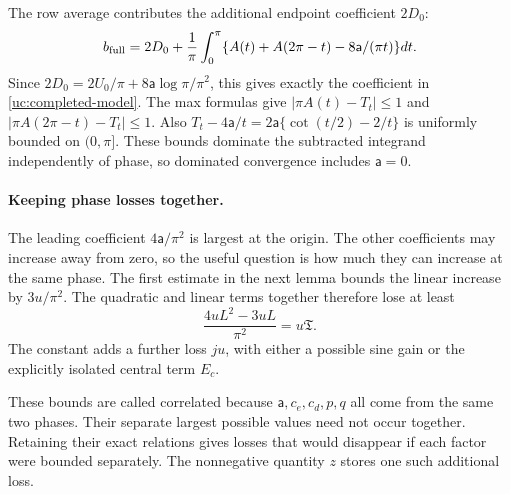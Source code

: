 The row average contributes the additional endpoint coefficient $2D_0$:
\[
 b_{\rm full}=2D_0+\frac1\pi\int_0^\pi
       \{A(t)+A(2\pi-t)-8\mathsf a/(\pi t)\}dt.
\]
Since $2D_0=2U_0/\pi+8\mathsf a\log\pi/\pi^2$, this gives exactly
the coefficient in \eqref{uc:completed-model}.
The max formulas give
$|\pi A(t)-T_t|\leq1$ and $|\pi A(2\pi-t)-T_t|\leq1$.
Also $T_t-4\mathsf a/t=2\mathsf a\{\cot(t/2)-2/t\}$ is uniformly
bounded on $(0,\pi]$. These bounds dominate the subtracted integrand
independently of phase, so dominated convergence includes $\mathsf{a}=0$.

\paragraph{Keeping phase losses together.}
The leading coefficient $4\mathsf{a}/\pi^2$ is largest at the origin. The
other coefficients may increase away from zero, so the useful question
is how much they can increase at the same phase. The first estimate
in the next lemma bounds the linear increase by $3u/\pi^2$. The
quadratic and linear terms together therefore lose at least
\[
 \frac{4uL^2-3uL}{\pi^2}=u\mathfrak{T}.
\]
The constant adds a further loss $ju$, with either a possible sine gain
or the explicitly isolated central term $E_c$.

These bounds are called correlated because $\mathsf{a},c_e,c_d,p,q$ all come
from the same two phases. Their separate largest possible values need
not occur together. Retaining their exact relations gives losses that
would disappear if each factor were bounded separately. The
nonnegative quantity $z$ stores one such additional loss.

